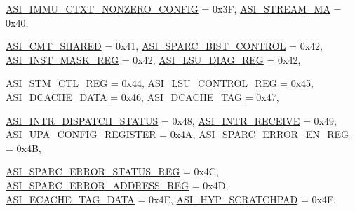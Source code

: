 \begin{DoxyCompactItemize}
\hyperlink{namespaceSparcISA_a6dd43f1311515252b283f56d7095a1f3a8faf2433e4ee4a065b5f9931c37d4cd2}{ASI\_\-IMMU\_\-CTXT\_\-NONZERO\_\-CONFIG} =  0x3F, 
\hyperlink{namespaceSparcISA_a6dd43f1311515252b283f56d7095a1f3aeccc3e5f625c582e246be9f3adc4b77e}{ASI\_\-STREAM\_\-MA} =  0x40, 
\par
\hyperlink{namespaceSparcISA_a6dd43f1311515252b283f56d7095a1f3a37b962f385eb65a0f6da2a4064ef6a30}{ASI\_\-CMT\_\-SHARED} =  0x41, 
\hyperlink{namespaceSparcISA_a6dd43f1311515252b283f56d7095a1f3a117efc8bc65e56f23f9353dae6f3b267}{ASI\_\-SPARC\_\-BIST\_\-CONTROL} =  0x42, 
\hyperlink{namespaceSparcISA_a6dd43f1311515252b283f56d7095a1f3a3ac6f10feef07332e8510eadb59e95e2}{ASI\_\-INST\_\-MASK\_\-REG} =  0x42, 
\hyperlink{namespaceSparcISA_a6dd43f1311515252b283f56d7095a1f3a96b37ee67457965285bec944de344af4}{ASI\_\-LSU\_\-DIAG\_\-REG} =  0x42, 
\par
\hyperlink{namespaceSparcISA_a6dd43f1311515252b283f56d7095a1f3a89653a6cc276b8912a1572d279db976e}{ASI\_\-STM\_\-CTL\_\-REG} =  0x44, 
\hyperlink{namespaceSparcISA_a6dd43f1311515252b283f56d7095a1f3a398eddc0651fd2d1a7bdc5e4875e7014}{ASI\_\-LSU\_\-CONTROL\_\-REG} =  0x45, 
\hyperlink{namespaceSparcISA_a6dd43f1311515252b283f56d7095a1f3a57cb1b9c5cb78146485798ecfc4f16b4}{ASI\_\-DCACHE\_\-DATA} =  0x46, 
\hyperlink{namespaceSparcISA_a6dd43f1311515252b283f56d7095a1f3af49c1cf1343e33054fe8b5f1ef62857f}{ASI\_\-DCACHE\_\-TAG} =  0x47, 
\par
\hyperlink{namespaceSparcISA_a6dd43f1311515252b283f56d7095a1f3a5994cd9fb9c576359f87d48f132fbd14}{ASI\_\-INTR\_\-DISPATCH\_\-STATUS} =  0x48, 
\hyperlink{namespaceSparcISA_a6dd43f1311515252b283f56d7095a1f3a05ad9f1202f97c6564641c1e6f9069c7}{ASI\_\-INTR\_\-RECEIVE} =  0x49, 
\hyperlink{namespaceSparcISA_a6dd43f1311515252b283f56d7095a1f3a5b7d3d1d4156040e74c0f8494cc2386c}{ASI\_\-UPA\_\-CONFIG\_\-REGISTER} =  0x4A, 
\hyperlink{namespaceSparcISA_a6dd43f1311515252b283f56d7095a1f3a8c09673cdcd8679f70b23acf234aebfa}{ASI\_\-SPARC\_\-ERROR\_\-EN\_\-REG} =  0x4B, 
\par
\hyperlink{namespaceSparcISA_a6dd43f1311515252b283f56d7095a1f3a647533f39b702d2b941cca947424010b}{ASI\_\-SPARC\_\-ERROR\_\-STATUS\_\-REG} =  0x4C, 
\hyperlink{namespaceSparcISA_a6dd43f1311515252b283f56d7095a1f3a943d70f6192cfec8f6c27cf0e17b5243}{ASI\_\-SPARC\_\-ERROR\_\-ADDRESS\_\-REG} =  0x4D, 
\hyperlink{namespaceSparcISA_a6dd43f1311515252b283f56d7095a1f3a042e89428c844e53d651cba0a9da3eed}{ASI\_\-ECACHE\_\-TAG\_\-DATA} =  0x4E, 
\hyperlink{namespaceSparcISA_a6dd43f1311515252b283f56d7095a1f3a711c94f5d67294ae30136ffb73ef95e0}{ASI\_\-HYP\_\-SCRATCHPAD} =  0x4F, 

\end{DoxyCompactItemize}
